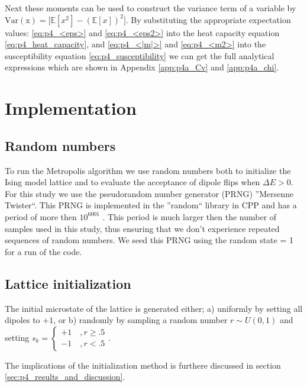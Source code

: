 \documentclass[../main_proj4_correct_template.tex]{subfiles}
\begin{document}
\noindent Next these moments can be used   to construct the variance term of a variable by $\operatorname{Var(x)} = \Big[\mathbb{E}[x^{2}] - (\mathbb{E}[x])^{2}\Big]$. By substituting the appropriate expectation values: \eqref{eq:p4_<eps>} and \eqref{eq:p4_<eps2>} into the heat capacity equation \eqref{eq:p4_heat_capacity}, and  \eqref{eq:p4_<|m|>} and \eqref{eq:p4_<m2>} into the susceptibility equation \eqref{eq:p4_susceptibility} we can get the full analytical expressions which are shown in Appendix \ref{app:p4a_Cv} and \ref{app:p4a_chi}.


\section{Implementation}\label{sec:p4_implementation}

\subsection{Random numbers}

To run the Metropolis algorithm we use random numbers both to initialize the Ising model lattice and to evaluate the acceptance of dipole flips when $\Delta E > 0$. For this study we use the pseudorandom number generator (PRNG) ''Mersenne Twister``. This PRNG is implemented in the ''random`` library in CPP and has a period of more then $10^{6001}$ \cite{lecture_notes}. This period is much larger then the number of samples used in this study, thus ensuring that we don't experience repeated sequences of random numbers. We seed this PRNG using the random state = 1 for a run of the code. 


\subsection{Lattice initialization}

The initial microstate of the lattice is generated either; a) uniformly by setting all dipoles to $+1$, or b) randomly by sampling a random number $r\sim U(0,1)$ and setting $s_k = \begin{cases} +1 \quad, r\geq.5 \\ -1\quad, r<.5\end{cases}$. 

\noindent The implications of the initialization method is furthere discussed in section \ref{sec:p4_results_and_discussion}.
\end{document}
